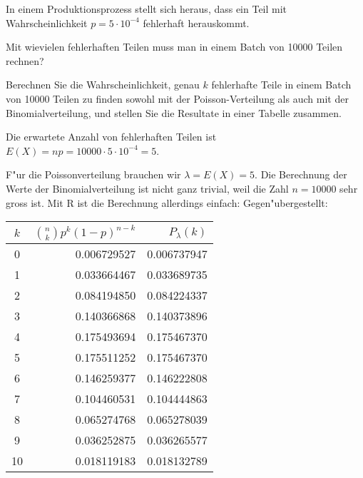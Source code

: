 In einem Produktionsprozess stellt sich heraus, dass ein Teil mit Wahrscheinlichkeit
$p=5\cdot10^{-4}$ fehlerhaft herauskommt.
\begin{teilaufgaben}
\item Mit wievielen fehlerhaften Teilen muss man in einem Batch von 10000 Teilen
rechnen?
\item Berechnen Sie die Wahrscheinlichkeit, genau $k$ fehlerhafte Teile in einem
Batch von 10000 Teilen zu finden sowohl mit der Poisson-Verteilung als auch
mit der Binomialverteilung, und stellen Sie die Resultate in einer Tabelle
zusammen.
\end{teilaufgaben}

\begin{loesung}
\begin{teilaufgaben}
\item Die erwartete Anzahl von fehlerhaften Teilen ist
$E(X)=np=10000\cdot 5\cdot10^{-4}=5$.
\item F"ur die Poissonverteilung brauchen wir $\lambda=E(X)=5$.
Die Berechnung der Werte der Binomialverteilung ist nicht ganz trivial, weil
die Zahl $n=10000$ sehr gross ist.
Mit R ist die Berechnung allerdings einfach:
Gegen"ubergestellt:
\begin{center}
\begin{tabular}{c|rr}
$k$&$\binom{n}{k}p^k(1-p)^{n-k}$&$P_\lambda(k)$\\
\hline
 0&0.006729527& 0.006737947\\
 1&0.033664467& 0.033689735\\
 2&0.084194850& 0.084224337\\
 3&0.140366868& 0.140373896\\
 4&0.175493694& 0.175467370\\
 5&0.175511252& 0.175467370\\
 6&0.146259377& 0.146222808\\
 7&0.104460531& 0.104444863\\
 8&0.065274768& 0.065278039\\
 9&0.036252875& 0.036265577\\
10&0.018119183& 0.018132789\\
\hline
\end{tabular}
\end{center}
\end{teilaufgaben}
\end{loesung}


